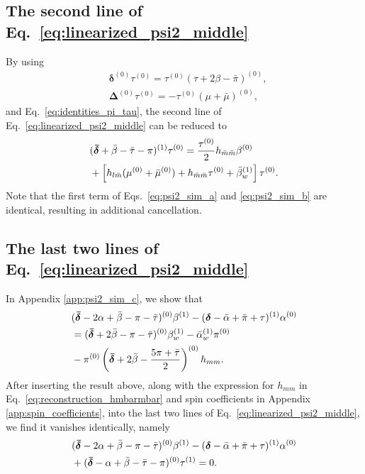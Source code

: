 \documentclass[aps,prd,amsmath,floats,floatfix, twocolumn,
superscriptaddress,nofootinbib,showpacs]{revtex4-1}
\begin{document}
\subsection{\texorpdfstring{The second line of Eq.~\eqref{eq:linearized_psi2_middle}}{linearized_psi2_middle}}
By using 
\begin{subequations}
\begin{align}
    &\bm{\delta}^{(0)} \tau^{(0)}=\tau^{(0)} (\tau+2\beta-\bar{\pi})^{(0)}, \\
    &\bm{\Delta}^{(0)} \tau^{(0)} = -\tau^{(0)}(\mu+\bar{\mu})^{(0)},
\end{align}  
\end{subequations}
and Eq.~\eqref{eq:identities_pi_tau},
the second line of Eq.~\eqref{eq:linearized_psi2_middle} can be reduced to 
\begin{align}
    &(\bm{\bar{\delta}}+\bar{\beta}-\bar{\tau}-\pi)^{(1)}\tau^{(0)}=\frac{\tau^{(0)}}{2}h_{\bar{m}\bar{m}}\beta^{(0)}\notag \\
    &+\left[h_{l\bar{m}}(\mu^{(0)}+\bar{\mu}^{(0)})+h_{\bar{m}\bar{m}}\tau^{(0)}+\bar{\beta}^{(1)}_w\right]\tau^{(0)} . \label{eq:psi2_sim_b}
\end{align}
Note that the first term of Eqs.~\eqref{eq:psi2_sim_a} and \eqref{eq:psi2_sim_b} are identical, resulting in additional cancellation.

\subsection{\texorpdfstring{The last two lines of Eq.~\eqref{eq:linearized_psi2_middle}}{linearized_psi2_middle}}
In Appendix \ref{app:psi2_sim_c}, we show that
\begin{align}
    &(\bm{\bar{\delta}}-2\alpha+\bar{\beta}-\pi-\bar{\tau})^{(0)}\beta^{(1)}-(\bm{\delta}-\bar{\alpha}+\bar{\pi}+\tau)^{(1)}\alpha^{(0)} \notag \\
    &=(\bm{\bar{\delta}}+2\bar{\beta}-\pi-\bar{\tau})^{(0)}\beta_w^{(1)}-\bar{\alpha}_w^{(1)}\pi^{(0)}\notag \\
    &-\pi^{(0)}\left(\bm{\bar{\delta}}+2\bar{\beta}-\frac{5\pi+\bar{\tau}}{2}\right)^{(0)}h_{mm}. \label{eq:psi2_sim_c}
\end{align}
After inserting the result above, along with the expression for $h_{mm}$ in Eq.~\eqref{eq:reconstruction_hmbarmbar} and spin coefficients in Appendix \ref{app:spin_coefficients}, into the last two lines of Eq.~\eqref{eq:linearized_psi2_middle}, we find it vanishes identically, namely
\begin{align}
    &(\bm{\bar{\delta}}-2\alpha+\bar{\beta}-\pi-\bar{\tau})^{(0)}\beta^{(1)}-(\bm{\delta}-\bar{\alpha}+\bar{\pi}+\tau)^{(1)}\alpha^{(0)}\notag \\
    &+(\bm{\bar{\delta}}-\alpha+\bar{\beta}-\bar{\tau}-\pi)^{(0)}\tau^{(1)}=0.  \label{eq:psi2_sim_c_final}
\end{align}
\end{document}

